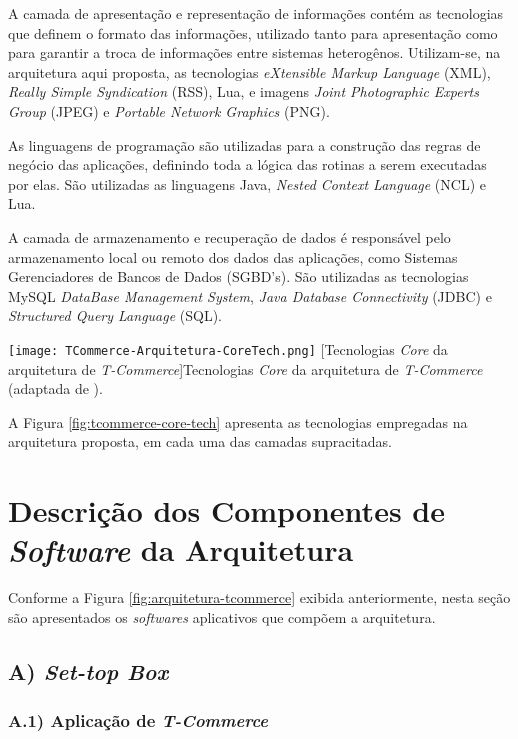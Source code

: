 A camada de apresentação e representação de informações contém as tecnologias
que definem o formato das informações, utilizado tanto para apresentação 
como para garantir a troca de informações entre sistemas heterogênos. 
Utilizam-se, na arquitetura aqui proposta, as tecnologias
\textit{eXtensible Markup Language} (XML), \textit{Really Simple Syndication} (RSS),
Lua, e imagens \textit{Joint Photographic Experts Group} (JPEG) e \textit{Portable Network Graphics} (PNG).

As linguagens de programação são utilizadas para a construção 
das regras de negócio das aplicações, definindo toda
a lógica das rotinas a serem executadas por elas.
São utilizadas as linguagens Java, \textit{Nested Context Language} (NCL) e Lua.

A camada de armazenamento e recuperação de dados
é responsável pelo armazenamento local ou remoto dos dados
das aplicações, como Sistemas Gerenciadores de Bancos de Dados (SGBD's).
São utilizadas as tecnologias MySQL \textit{DataBase Management System}, 
\textit{Java Database Connectivity} (JDBC) e \textit{Structured Query Language} (SQL).

\begin{center}
	\texttt{[image: TCommerce-Arquitetura-CoreTech.png]}
	[Tecnologias \textit{Core} da arquitetura de \textit{T-Commerce}]{Tecnologias \textit{Core} da arquitetura de \textit{T-Commerce} (adaptada de \cite{chu2007evolution}).}
	\label{fig:tcommerce-core-tech}
\end{center}

A Figura \ref{fig:tcommerce-core-tech} apresenta as tecnologias empregadas na arquitetura proposta,
em cada uma das camadas supracitadas.


\section{Descrição dos Componentes de \textit{Software} da Arquitetura}

Conforme a Figura \ref{fig:arquitetura-tcommerce} exibida anteriormente,
nesta seção são apresentados os \textit{softwares} aplicativos que compõem
a arquitetura.

\subsection*{A) \textit{Set-top Box}}

\subsubsection*{A.1) Aplicação de \textit{T-Commerce}}

